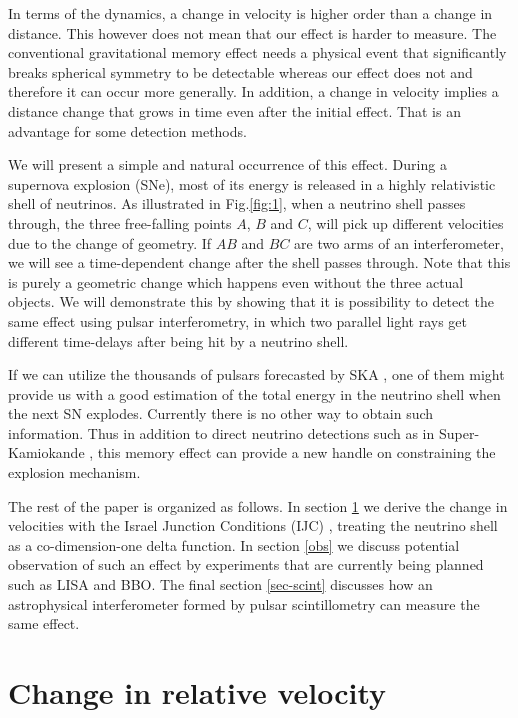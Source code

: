 \documentclass[aps,showpacs,twocolumn,floats,prd,superscriptaddress,nofootinbib]{revtex4-1}
\begin{document}
In terms of the dynamics, a change in velocity is higher order than a change in distance. This however does not mean that our effect is harder to measure. The conventional gravitational memory effect needs a physical event that significantly breaks spherical symmetry to be detectable whereas our effect does not and therefore it can occur more generally. In addition, a change in velocity implies a distance change that grows in time even after the initial effect. That is an advantage for some detection methods.  

We will present a simple and natural occurrence of this effect. During a supernova explosion (SNe), most of its energy is released in a highly relativistic shell of neutrinos. As illustrated in Fig.\ref{fig:1}, when a neutrino shell passes through, the three free-falling points $A$, $B$ and $C$, will pick up different velocities due to the change of geometry. If $AB$ and $BC$ are two arms of an interferometer, we will see a time-dependent change after the shell passes through. Note that this is purely a geometric change which happens even without the three actual objects. We will demonstrate this by showing that it is possibility to detect the same effect using pulsar interferometry, in which two parallel light rays get different time-delays after being hit by a neutrino shell. 

If we can utilize the thousands of pulsars forecasted by SKA \cite{MSPpopulation}, one of them might provide us with a good estimation of the total energy in the neutrino shell when the next SN explodes. Currently there is no other way to obtain such information. Thus in addition to direct neutrino detections such as in Super-Kamiokande \cite{SuperKSN}, this memory effect can provide a new handle on constraining the explosion mechanism. 

The rest of the paper is organized as follows. In section \ref{RelV} we derive the change in velocities with the Israel Junction Conditions (IJC) \cite{Isr66}, treating the neutrino shell as a co-dimension-one delta function. In section \ref{obs} we discuss potential observation of such an effect by experiments that are currently being planned such as LISA and BBO. The final section \ref{sec-scint} discusses how an astrophysical interferometer formed by pulsar scintillometry can measure the same effect.


\section{Change in relative velocity}
\label{RelV}
\end{document}
